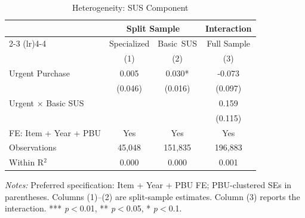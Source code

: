 \begin{table}[ht]
  \centering
  \caption{Heterogeneity: SUS Component}
  \label{tab:het_sus}
  \small
  \begin{threeparttable}
  \begin{tabular}{lccc}
    \hline\hline
    & \multicolumn{2}{c}{Split Sample} & Interaction \\
    \cmidrule(lr){2-3} \cmidrule(lr){4-4}
    & Specialized & Basic~SUS & Full Sample \\
    & (1) & (2) & (3) \\
    \hline
    Urgent Purchase & 0.005 & 0.030* & -0.073 \\
     & (0.046) & (0.016) & (0.097) \\[3pt]
    Urgent × Basic SUS &  &  & 0.159 \\
     &  &  & (0.115) \\[3pt]
    \hline
    FE: Item + Year + PBU & Yes & Yes & Yes \\
    Observations & 45,048 & 151,835 & 196,883 \\
    Within R$^2$ & 0.000 & 0.000 & 0.001 \\
    \hline\hline
  \end{tabular}
  \begin{tablenotes}
    \small
    \item \textit{Notes:} Preferred specification: Item + Year + PBU FE; PBU-clustered SEs in parentheses. Columns (1)--(2) are split-sample estimates. Column (3) reports the interaction. *** \textit{p}$<$0.01, ** \textit{p}$<$0.05, * \textit{p}$<$0.1.
  \end{tablenotes}
  \end{threeparttable}
\end{table}

